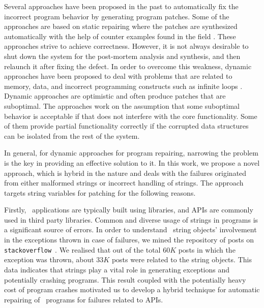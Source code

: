 Several approaches have been proposed in the past to automatically fix the incorrect program behavior by generating program patches.
Some of the approaches are based on static repairing
where the patches are synthesized automatically with the help of counter examples
found in the field \cite{wei-issta-2010}. These approaches strive to achieve correctness.
However, it is not always desirable to shut down the system for the post-mortem analysis and synthesis, and then relaunch it
after fixing the defect. In order to overcome this weakness,
dynamic approaches have been proposed to deal with problems that are
related to memory, data, and incorrect programming constructs such as infinite
loops \cite{Carbin:2011, KlingMCR12, conf/sosp/PerkinsKLABCPSSSWZER09}.
Dynamic approaches are optimistic and often produce patches that are suboptimal.
The approaches work on the
assumption that some suboptimal behavior is acceptable if that does not
interfere with the core functionality. Some of them provide
partial functionality correctly if the corrupted data structures can be isolated from the rest of the system.

In general, for dynamic approaches for program repairing, narrowing the problem
is the key in providing an effective solution to it. In this work, we propose a novel
approach, which is hybrid in the nature and
deals with the failures originated from either malformed strings or incorrect
handling of strings. The approach targets string variables for patching for the following reasons.

Firstly, \java\ applications are typically built using libraries, and  APIs
are commonly used in third party libraries. Common and diverse usage of strings
in programs is a significant source of errors. In order to understand \java\ string objects'
involvement in the exceptions thrown in case of failures, we mined the repository of posts
on \texttt{stackoverflow}~\cite{stackoverflow}. We realised that out
of the total $60K$ posts in which the exception was thrown, about $33K$ posts were
related to the \java string objects. This data indicates that strings play a vital
role in generating exceptions and potentially crashing programs. This result
coupled with the potentially
heavy cost of program crashes motivated us to develop a hybrid technique for
automatic repairing of \java\ programs for failures related to 
APIs.


